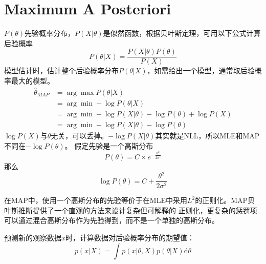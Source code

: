 \section{Maximum A Posteriori}
$P(\theta)$先验概率分布，$P(X|\theta)$是似然函数，根据贝叶斯定理，可用以下公式计算后验概率
\begin{equation}
    P(\theta|X) = \frac{P(X|\theta)P(\theta)}{P(X)}
\end{equation}
模型估计时，估计整个后验概率分布$P(\theta|X)$，如需给出一个模型，通常取后验概率最大的模型。
\begin{equation}
    \begin{split}
        \hat{\theta}_{MAP} &= \arg \max P(\theta | X) \\
        &= \arg \min -\log P(\theta | X) \\
        &= \arg \min -\log P(X|\theta) - \log P(\theta) + \log P(X) \\
        &= \arg \min -\log P(X|\theta) - \log P(\theta)
    \end{split}
\end{equation}
$\log P(X)$与$\theta$无关，可以丢掉。$-\log P(X|\theta)$其实就是NLL，所以MLE和MAP不同在$- \log P(\theta)$。
假定先验是一个高斯分布
\begin{equation}
    P(\theta) = C \times e^{-\frac{\theta^2}{2\sigma^2}}
\end{equation}
那么
\begin{equation}
    \log P(\theta) = C + \frac{\theta^2}{2\sigma^2}
\end{equation}

在MAP中，使用一个高斯分布的先验等价于在MLE中采用$L^2$的正则化。MAP贝叶斯推断提供了一个直观的方法来设计复杂但可解释的
正则化，更复杂的惩罚项可以通过混合高斯分布作为先验得到，而不是一个单独的高斯分布。


预测新的观察数据$x$时，计算数据对后验概率分布的期望值：
\begin{equation}
    p(x|X) = \int p(x | \theta, X)p(\theta|X)\mathrm{d}\theta
\end{equation}
